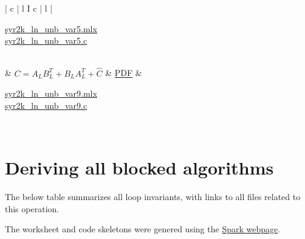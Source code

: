\begin{center}
\begin{tabular}{| c | l I c | l |}
\begin{minipage}{0.3\textwidth}
    	\href{syr2k_ln/flameatlab/syr_2k_unb_var5.mlx}
    	{syr2k\_ln\_unb\_var5.mlx}\\
    	\href{syr2k_ln/FLAMEC/syr_2k_unb_var5.c}
    	{syr2k\_ln\_unb\_var5.c}
	    \end{minipage}
	    \\  & 
	    $
	    C = A_L B_L ^ T + B_L A_L ^ T + \widehat C
	    $
	    &
	    \href{syr2k_ln/Derivations/syr2k_ln_unb_var9.pdf}
	    {PDF}
	    &
	    \begin{minipage}{0.3\textwidth}
    	\href{syr2k_ln/flameatlab/syr_2k_unb_var9.mlx}
    	{syr2k\_ln\_unb\_var9.mlx}\\
    	\href{syr2k_ln/FLAMEC/syr_2k_unb_var9.c}
    	{syr2k\_ln\_unb\_var9.c}
	    \end{minipage}
	    \\ \hline
	\end{tabular}
\end{center}

\section{Deriving all blocked algorithms}

The below table summarizes all loop invariants, with links to all files related to this operation.

\noindent The worksheet and code skeletons were genered using 
the \href{http://edx-org-utaustinx.s3.amazonaws.com/UT1401x/LAFFPfC/Spark/index.html}{ Spark webpage}.


